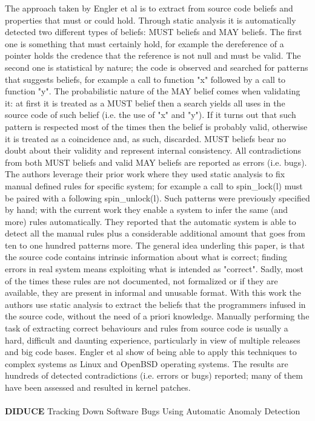 The approach taken by Engler et al is to extract from source code beliefs and properties that must or could hold. Through static analysis it is automatically detected two different types of beliefs: MUST beliefs and MAY beliefs. The first one is something that must certainly hold, for example the dereference of a pointer holds the credence that the reference is not null and must be valid. The second one is statistical by nature; the code is observed and searched for patterns that suggests beliefs, for example a call to function "x" followed by a call to function "y". The probabilistic nature of the MAY belief comes when validating it: at first it is treated as a MUST belief then a search yields all uses in the source code of such belief (i.e. the use of "x" and "y"). If it turns out that such pattern is respected most of the times then the belief is probably valid, otherwise it is treated as a coincidence and, as such, discarded.
MUST beliefs bear no doubt about their validity and represent internal consistency. All contradictions from both MUST beliefs and valid MAY beliefs are reported as errors (i.e. bugs).
The authors leverage their prior work \cite{engler2000checking} where they used static analysis to fix manual defined rules for specific system; for example a call to spin\_lock(l) must be paired with a following spin\_unlock(l). Such patterns were previously specified by hand; with the current work they enable a system to infer the same (and more) rules automatically. They reported that the automatic system is able to detect all the manual rules plus a considerable additional amount that goes from ten to one hundred patterns more.
The general idea underling this paper, is that the source code contains intrinsic information about what is correct; finding errors in real system means exploiting what is intended as "correct". Sadly, most of the times these rules are not documented, not formalized or if they are available, they are present in informal and unusable format.
With this work the authors use static analysis to extract the beliefs that the programmers infused in the source code, without the need of a priori knowledge.
Manually performing the task of extracting correct behaviours and rules from source code is usually a hard, difficult and daunting experience, particularly in view of multiple releases and big code bases. Engler et al show of being able to apply this techniques to complex systems as Linux and OpenBSD operating systems. The results are hundreds of detected contradictions (i.e. errors or bugs) reported; many of them have been assessed and resulted in kernel patches.
\\
\\
\textbf{DIDUCE} \cite{hangal2002tracking} Tracking Down Software Bugs Using Automatic Anomaly Detection


